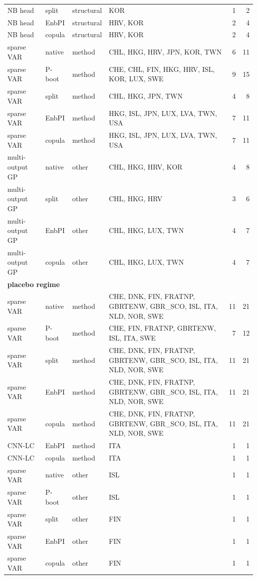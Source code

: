 {\begin{longtable}{@{}llp{1.5cm}p{5.6cm}rr@{}}
NB head & split & structural & KOR & 1 & 2 \\
NB head & EnbPI & structural & HRV, KOR & 2 & 4 \\
NB head & copula & structural & HRV, KOR & 2 & 4 \\
sparse VAR & native & method & CHL, HKG, HRV, JPN, KOR, TWN & 6 & 11 \\
sparse VAR & P-boot & method & CHE, CHL, FIN, HKG, HRV, ISL, KOR, LUX, SWE & 9 & 15 \\
sparse VAR & split & method & CHL, HKG, JPN, TWN & 4 & 8 \\
sparse VAR & EnbPI & method & HKG, ISL, JPN, LUX, LVA, TWN, USA & 7 & 11 \\
sparse VAR & copula & method & HKG, ISL, JPN, LUX, LVA, TWN, USA & 7 & 11 \\
multi-output GP & native & other & CHL, HKG, HRV, KOR & 4 & 8 \\
multi-output GP & split & other & CHL, HKG, HRV & 3 & 6 \\
multi-output GP & EnbPI & other & CHL, HKG, LUX, TWN & 4 & 7 \\
multi-output GP & copula & other & CHL, HKG, LUX, TWN & 4 & 7 \\
\multicolumn{6}{l}{\textbf{placebo regime}} \\
\midrule
sparse VAR & native & method & CHE, DNK, FIN, FRATNP, GBRTENW, GBR\_SCO, ISL, ITA, NLD, NOR, SWE & 11 & 21 \\
sparse VAR & P-boot & method & CHE, FIN, FRATNP, GBRTENW, ISL, ITA, SWE & 7 & 12 \\
sparse VAR & split & method & CHE, DNK, FIN, FRATNP, GBRTENW, GBR\_SCO, ISL, ITA, NLD, NOR, SWE & 11 & 21 \\
sparse VAR & EnbPI & method & CHE, DNK, FIN, FRATNP, GBRTENW, GBR\_SCO, ISL, ITA, NLD, NOR, SWE & 11 & 21 \\
sparse VAR & copula & method & CHE, DNK, FIN, FRATNP, GBRTENW, GBR\_SCO, ISL, ITA, NLD, NOR, SWE & 11 & 21 \\
CNN-LC & EnbPI & method & ITA & 1 & 1 \\
CNN-LC & copula & method & ITA & 1 & 1 \\
sparse VAR & native & other & ISL & 1 & 1 \\
sparse VAR & P-boot & other & ISL & 1 & 1 \\
sparse VAR & split & other & FIN & 1 & 1 \\
sparse VAR & EnbPI & other & FIN & 1 & 1 \\
sparse VAR & copula & other & FIN & 1 & 1 \\

\end{longtable}}
